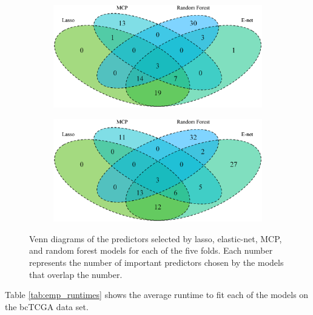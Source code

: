 \documentclass{article}
\begin{document}
\begin{figure}[b!]
\begin{subfigure}[b]{0.45\textwidth}
		\label{fig:venn3}
	\end{subfigure}
	\begin{subfigure}[b]{0.45\textwidth}
		\includegraphics[width=\textwidth]{images/venn/venn4.eps}
		\label{fig:venn4}
	\end{subfigure}
	\hspace{30pt}
	\begin{subfigure}[b]{0.45\textwidth}
		\includegraphics[width=\textwidth]{images/venn/venn5.eps}
		\label{fig:venn5}
	\end{subfigure}
	\captionsetup{width = 5in}
	\caption{Venn diagrams of the predictors selected by lasso, elastic-net, MCP, and random forest models for each of the five folds. Each number represents the number of important predictors chosen by the models that overlap the number.}
	\label{fig:venn}
\end{figure}

Table \ref{tab:emp_runtimes} shows the average runtime to fit each of the models on the bcTCGA data set.
\end{document}
